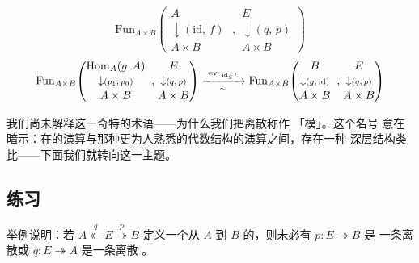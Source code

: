 \begin{theorem}[模的 \trYonedaLemma]
{\[\mathrm{Fun}_{A\times B}\!\left(
\begin{gathered}
A\\[-2pt]
\downarrow\scriptstyle (\mathrm{id},\,f)\\[-2pt]
A\times B
\end{gathered}
\;\right.,
\left.
\begin{gathered}
E\\[-2pt]
\downarrow\scriptstyle (q,\,p)\\[-2pt]
A\times B
\end{gathered}
\right)
\]}
{\small\[
\mathrm{Fun}_{A\times B}\!\left(
\begin{gathered}
\mathrm{Hom}_{A}(g,A)\\[-2pt]
\downarrow\scriptstyle (p_{1},\,p_{0})\\[-2pt]
A\times B
\end{gathered}
\;\right.,
\left.
\begin{gathered}
E\\[-2pt]
\downarrow\scriptstyle (q,\,p)\\[-2pt]
A\times B
\end{gathered}
\right)
\xrightarrow[\ \sim\ ]{\ \mathrm{ev}_{\ulcorner\mathrm{id}_{g}\urcorner}\ }
\mathrm{Fun}_{A\times B}\!\left(
\begin{gathered}
B\\[-2pt]
\downarrow\scriptstyle (g,\,\mathrm{id})\\[-2pt]
A\times B
\end{gathered}
\;\right.,
\left.
\begin{gathered}
E\\[-2pt]
\downarrow\scriptstyle (q,\,p)\\[-2pt]
A\times B
\end{gathered}
\right)
\]}
\end{theorem}

我们尚未解释这一奇特的术语——为什么我们把离散\trTwoSidedFibration{}称作
「模」。这个名号
意在暗示：在\trModule{}的演算与那种更为人熟悉的代数结构的演算之间，存在一种
深层结构类比——下面我们就转向这一主题。

\subsection*{练习}

\begin{exercise}\label{ex:module-legs-not-discrete}
举例说明：若 $A\overset{q}{\twoheadleftarrow}E\overset{p}{\twoheadrightarrow}B$
定义一个从 $A$ 到 $B$ 的\trModule{}，则未必有 $p\colon E\twoheadrightarrow B$ 是
一条离散\trCartesianFibration{}或 $q\colon E\twoheadrightarrow A$ 是一条离散%
\trCocartesianFibration{}。
\end{exercise}

